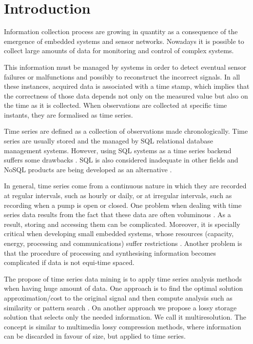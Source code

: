 


\section{Introduction}

Information collection process are growing in quantity as a
consequence of the emergence of embedded systems and sensor networks.
Nowadays it is possible to collect large amounts of data for
monitoring and control of complex systems.

This information must be managed by systems in order to detect
eventual sensor failures or malfunctions and possibly to reconstruct
the incorrect signals. In all these instances, acquired data is
associated with a time stamp, which implies that the correctness of
those data depends not only on the measured value but also on the time
as it is collected. When observations are collected at specific
time instants, they are formalised as time series.

Time series are defined as a collection of observations made
chronologically. Time series are usually stored and the managed by SQL
relational database management systems. However, using SQL systems as
a time series backend suffers some drawbacks
\cite{dreyer94,schmidt95,stonebraker09:scidb,zhang11}. SQL is also
considered inadequate in other fields and NoSQL products are being
developed as an alternative
\cite{atzeni13:relational_model_dead,stonebraker10}.

In general, time series come from a continuous nature in which they
are recorded at regular intervals, such as hourly or daily, or at
irregular intervals, such as recording when a pump is open or closed.
One problem when dealing with time series data results from the fact
that these data are often voluminous \cite{fu11,keogh08:isax}. As a
result, storing and accessing them can be complicated. Moreover, it is
specially critical when developing small embedded systems, whose
resources (capacity, energy, processing and communications) suffer
restrictions \cite{yaogehrke02}.  Another problem is that the
procedure of processing and synthesising information becomes
complicated if data is not equi-time spaced.

The propose of time series data mining is to apply time series
analysis methods when having huge amount of data.  One approach is to
find the optimal solution approximation/cost to the original signal
and then compute analysis such as similarity or pattern search
\cite{fu11,keogh01}. On another approach we propose a lossy storage
solution that selects only the needed information. We call it
multiresolution. The concept is similar to multimedia lossy
compression methods, where information can be discarded in favour of
size, but applied to time series.



